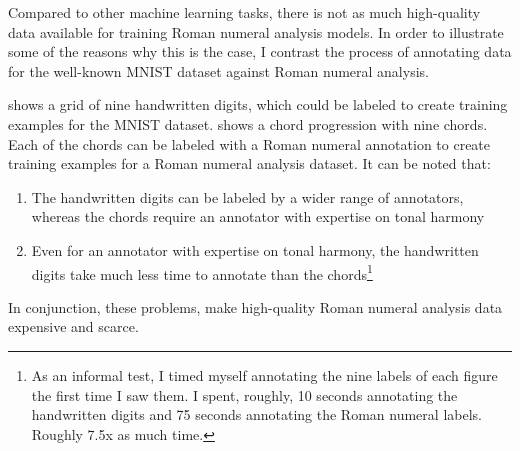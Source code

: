 

Compared to other machine learning tasks, there is not as
much high-quality data available for training Roman numeral
analysis models. In order to illustrate some of the reasons
why this is the case, I contrast the process of annotating
data for the well-known MNIST dataset
\parencite{lecun1989handwritten} against Roman numeral analysis.


 shows a grid of nine handwritten digits,
which could be labeled to create training examples for the MNIST dataset.
 shows a chord progression with nine chords.
Each of the chords can be labeled with a Roman numeral
annotation to create training examples for a Roman numeral analysis dataset. It can be noted
that:

\begin{enumerate}
    \item The handwritten digits can be labeled by a wider
    range of annotators, whereas the chords require an annotator with expertise on tonal harmony
    \item Even for an annotator with expertise on tonal harmony, the handwritten digits take much less time to annotate than the chords\footnote{As an informal test, I timed myself annotating the nine labels of each figure the first time I saw them. I spent, roughly, 10 seconds annotating the handwritten digits and 75 seconds annotating the Roman numeral labels. Roughly 7.5x as much time.}
\end{enumerate}

In conjunction, these problems, make high-quality Roman numeral analysis data expensive and scarce.


